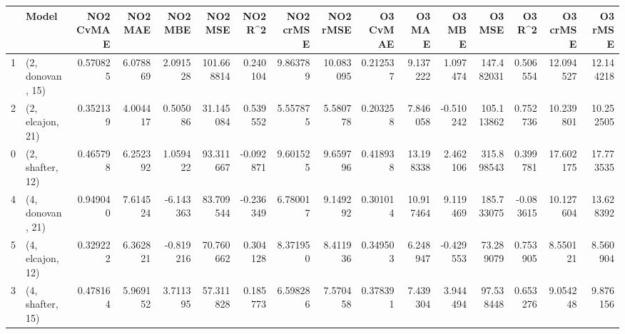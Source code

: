 \begin{tabular}{llrrrrrrrrrrrrrr}
\toprule
{} &             Model &  NO2 CvMAE &   NO2 MAE &   NO2 MBE &     NO2 MSE &   NO2 R\textasciicircum2 &  NO2 crMSE &   NO2 rMSE &  O3 CvMAE &     O3 MAE &    O3 MBE &      O3 MSE &    O3 R\textasciicircum2 &   O3 crMSE &    O3 rMSE \\
\midrule
1 &  (2, donovan, 15) &   0.570825 &  6.078869 &  2.091528 &  101.668814 &  0.240104 &   9.863789 &  10.083095 &  0.212537 &   9.137222 &  1.097474 &  147.482031 &  0.506554 &  12.094527 &  12.144218 \\
2 &  (2, elcajon, 21) &   0.352139 &  4.004417 &  0.505086 &   31.145084 &  0.539552 &   5.557875 &   5.580778 &  0.203258 &   7.846058 & -0.510242 &  105.113862 &  0.752736 &  10.239801 &  10.252505 \\
0 &  (2, shafter, 12) &   0.465798 &  6.252392 &  1.059422 &   93.311667 & -0.092871 &   9.601525 &   9.659796 &  0.418938 &  13.198338 &  2.462106 &  315.898543 &  0.399781 &  17.602175 &  17.773535 \\
4 &  (4, donovan, 21) &   0.949040 &  7.614524 & -6.143363 &   83.709544 & -0.236349 &   6.780017 &   9.149292 &  0.301014 &  10.917464 &  9.119469 &  185.733075 & -0.083615 &  10.127604 &  13.628392 \\
5 &  (4, elcajon, 12) &   0.329222 &  6.362821 & -0.819216 &   70.760662 &  0.304128 &   8.371950 &   8.411936 &  0.349503 &   6.248947 & -0.429553 &   73.289079 &  0.753905 &   8.550121 &   8.560904 \\
3 &  (4, shafter, 15) &   0.478164 &  5.969152 &  3.711395 &   57.311828 &  0.185773 &   6.598286 &   7.570458 &  0.378391 &   7.439304 &  3.944494 &   97.538448 &  0.653276 &   9.054248 &   9.876156 \\
\bottomrule
\end{tabular}
